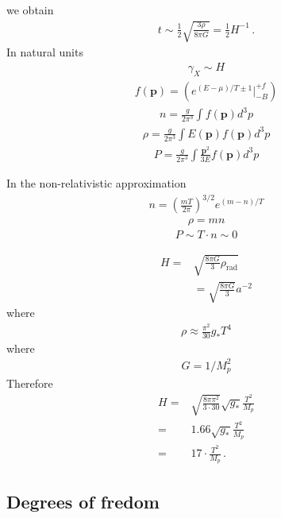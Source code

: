 \documentclass[12pt,letterpaper]{article}
\begin{document}
we obtain
\begin{align*}
  t\sim \frac{1}{2}\sqrt{\frac{3\rho}{8\pi G}}=\frac{1}{2}H^{-1}\,.
\end{align*}
In natural units
\begin{align*}
  \gamma_X\sim H
\end{align*}
\begin{align*}
  f(\mathbf{p})=
  \left(
   e^{(E-\mu)/T\pm 1}|_{-B}^{+f}
  \right)
\end{align*}
\begin{align*}
  n=\frac{g}{2\pi^3}\int f(\mathbf{p})d^3p
\end{align*}
\begin{align*}
  \rho=\frac{g}{2\pi^3}\int E(\mathbf{p}) f(\mathbf{p})d^3p
\end{align*}
\begin{align*}
  P=\frac{g}{2\pi^3}\int \frac{\mathbf{p}^2}{3E} f(\mathbf{p})d^3p
\end{align*}

In the non-relativistic approximation
\begin{align*} 
n=
\left(
\frac{mT}{2\pi}
\right)^{3/2} e^{(m-n)/T}
\end{align*}
\begin{align*}
  \rho=mn
\end{align*}
\begin{align*}
  P\sim T\cdot n\sim 0
\end{align*}

\begin{align*}
   H=&\sqrt{\frac{8\pi G}{3}\rho_\text{rad}}\nonumber\\
&=\sqrt{\frac{8\pi G}{3}}a^{-2}
\end{align*}
where
\begin{align*}
  \rho\approx \frac{\pi^2}{30}g_* T^4
\end{align*}
where
\begin{align*}
  G=1/M_p^2
\end{align*}
Therefore
\begin{align*}
  H=&\sqrt{\frac{8\pi\pi^2}{3\cdot 30}}\sqrt{g_*}\frac{T^2}{M_p}\nonumber\\
=& 1.66\sqrt{g_*}\frac{T^2}{M_p}\nonumber\\
=&17\cdot \frac{T^2}{M_p}\,.
\end{align*}

\subsection{Degrees of fredom}
\end{document}
